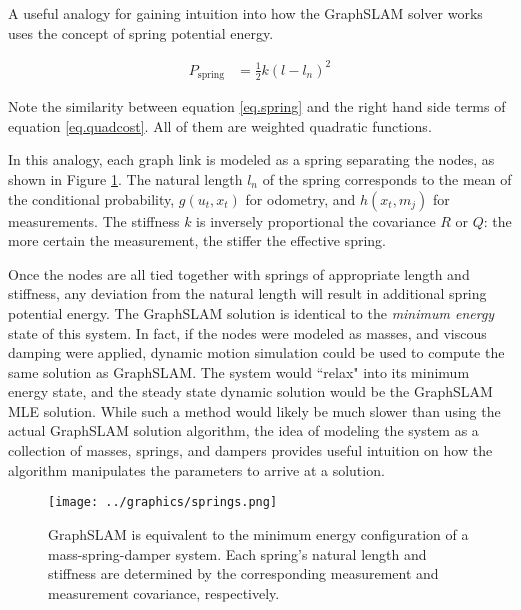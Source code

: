 A useful analogy for gaining intuition into how the GraphSLAM solver works uses the concept of spring potential energy. 

\begin{align}
P_{\text{spring}} &= \frac{1}{2}k\left(l-l_n\right)^2
\label{eq.spring}
\end{align}

Note the similarity between equation \ref{eq.spring} and the right hand side terms of equation \ref{eq.quadcost}. All of them are weighted quadratic functions.

In this analogy, each graph link is modeled as a spring separating the nodes, as shown in Figure \ref{fig:springs}. The natural length $l_n$ of the spring corresponds to the mean of the conditional probability,  $g\left(u_t,x_t\right)$ for odometry, and $h\left(x_t,m_j\right)$ for measurements. The stiffness $k$ is inversely proportional the covariance $R$ or $Q$: the more certain the measurement, the stiffer the effective spring. 

Once the nodes are all tied together with springs of appropriate length and stiffness, any deviation from the natural length will result in additional spring potential energy. The GraphSLAM solution is identical to the \emph{minimum energy} state of this system. In fact, if the nodes were modeled as masses, and viscous damping were applied, dynamic motion simulation could be used to compute the same solution as GraphSLAM. The system would ``relax" into its minimum energy state, and the steady state dynamic solution would be the GraphSLAM MLE solution. While such a method would likely be much slower than using the actual GraphSLAM solution algorithm, the idea of modeling the system as a collection of masses, springs, and dampers provides useful intuition on how the algorithm manipulates the parameters to arrive at a solution.

\begin{figure}[htb]
   \centering
   \texttt{[image: ../graphics/springs.png]} %
   \caption{GraphSLAM is equivalent to the minimum energy configuration of a mass-spring-damper system. Each spring's natural length and stiffness are determined by the corresponding measurement and measurement covariance, respectively.}
   \label{fig:springs}
\end{figure}




